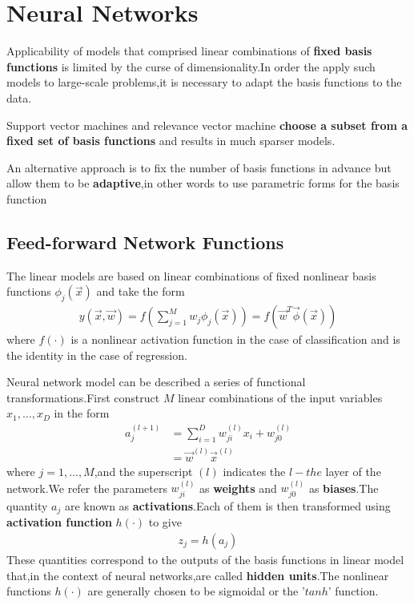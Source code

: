 \chapter{Neural Networks}
\label{chapter:neural networks}

Applicability of models that comprised linear combinations of \textbf{fixed basis functions} is limited by the curse of dimensionality.In order the apply such models to large-scale problems,it is necessary to adapt the basis functions to the data.

Support vector machines and relevance vector machine \textbf{choose a subset from a fixed set of basis functions} and results in much sparser models.

An alternative approach is to fix the number of basis functions in advance but allow them to be \textbf{adaptive},in other words to use parametric forms for the basis function 
\section{Feed-forward Network Functions}
The linear models are based on linear combinations of fixed nonlinear basis functions $\phi_j(\vec{x})$ and take the form
\begin{align}
    y(\vec{x},\vec{w}) = f(\sum_{j=1}^{M}w_j\phi_j(\vec{x})) = f(\vec{w}^T\vec{\phi}(\vec{x}))
\end{align}
where $f(\cdot)$ is a nonlinear activation function in the case of classification and is the identity in the case of regression.

Neural network model can be described a series of functional transformations.First construct $M$ linear combinations of the input variables $x_1,\ldots,x_D$ in the form
\begin{align}
    a_j^{(l+1)} &= \sum_{i=1}^{D}w_{ji}^{(l)}x_i+w_{j0}^{(l)} \\
	    &= \vec{w}^{(l)}\vec{x}^{(l)}
\end{align}
where $j=1,\ldots,M$,and the superscript $(l)$ indicates the $l-the$ layer of the network.We refer the parameters $w_{ji}^{(l)}$ as \textbf{weights} and $w_{j0}^{(l)}$ as \textbf{biases}.The quantity $a_j$ are known as \textbf{activations}.Each of them is then transformed using \textbf{activation function} $h(\cdot)$ to give
\begin{align}
    z_j=h(a_j)
\end{align}
These quantities correspond to the outputs of the basis functions in linear model that,in the context of neural networks,are called \textbf{hidden units}.The nonlinear functions $h(\cdot)$ are generally chosen to be sigmoidal or the '$tanh$' function.

